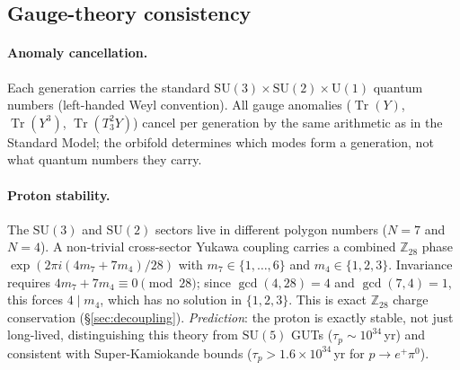 \subsection{Gauge-theory consistency}

\paragraph{Anomaly cancellation.}
Each generation carries the standard
$\mathrm{SU}(3) \times \mathrm{SU}(2) \times \mathrm{U}(1)$
quantum numbers (left-handed Weyl convention).
All gauge anomalies ($\operatorname{Tr}(Y)$,
$\operatorname{Tr}(Y^3)$, $\operatorname{Tr}(T_3^2 Y)$)
cancel per generation by the same arithmetic as in the
Standard Model; the orbifold determines which modes
form a generation, not what quantum numbers they carry.

\paragraph{Proton stability.}
\label{cor:proton-stability}%
The $\mathrm{SU}(3)$ and $\mathrm{SU}(2)$ sectors live in different
polygon numbers ($N = 7$ and $N = 4$).  A non-trivial
cross-sector Yukawa coupling carries a combined
$\mathbb{Z}_{28}$ phase
$\exp(2\pi i(4m_7 + 7m_4)/28)$ with $m_7 \in \{1,\ldots,6\}$
and $m_4 \in \{1,2,3\}$.  Invariance requires
$4m_7 + 7m_4 \equiv 0 \pmod{28}$; since $\gcd(4,28) = 4$
and $\gcd(7,4) = 1$, this forces $4 \mid m_4$, which has no
solution in $\{1,2,3\}$.
This is exact $\mathbb{Z}_{28}$ charge conservation
(\S\ref{sec:decoupling}).
\emph{Prediction}: the proton is exactly stable, not just
long-lived, distinguishing this theory from $\mathrm{SU}(5)$ GUTs
($\tau_p \sim 10^{34}$\,yr) and consistent with Super-Kamiokande
bounds ($\tau_p > 1.6 \times 10^{34}$\,yr for $p \to e^+\pi^0$).

